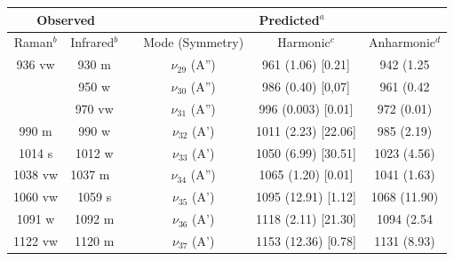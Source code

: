 	\begin{table}[H]
		\begin{center}
			\begin{threeparttable}
				\begin{tabular}{c c c c c c}
					\hline
					\multicolumn{ 2}{c}{Observed} & \multicolumn{1}{c}{} & \multicolumn{ 3}{c}{Predicted$^{a}$} \\ \hline
					Raman$^{b}$ & \multicolumn{1}{c}{Infrared$^{b}$} &  & \multicolumn{1}{c}{Mode (Symmetry)} & \multicolumn{1}{c}{Harmonic$^{c}$} & Anharmonic$^{d}$ \\ \hline
					936 vw & 930 m &  & $\nu_{29}$ (A”) & 961 (1.06) [0.21] & 942 (1.25 \\ 
					& 950 w &  & $\nu_{30}$ (A”) & 986 (0.40) [0,07] & 961 (0.42 \\ 
					& 970 vw &  & $\nu_{31}$ (A”) & 996 (0.003) [0.01] & 972 (0.01) \\ 
					990 m & 990 w &  & $\nu_{32}$ (A’) & 1011 (2.23) [22.06] & 985 (2.19) \\ 
1014 s& 1012 w&  & $\nu_{33}$ (A’)& 1050 (6.99) [30.51] & 1023 (4.56)\\ 
1038 vw& \multicolumn{1}{l}{  1037 m } &  & \multicolumn{1}{c}{$\nu_{34}$ (A”)} & 1065 (1.20) [0.01] & 1041 (1.63) \\ 
1060 vw& 1059 s&  & \multicolumn{1}{c}{	$\nu_{35}$ (A’)} & 1095 (12.91) [1.12] & 1068 (11.90)\\ 
1091 w& 1092 m&  & \multicolumn{1}{c}{	$\nu_{36}$ (A’)} & 1118 (2.11) [21.30] & 1094 (2.54 \\ 
1122 vw& 1120 m&  & \multicolumn{1}{c}{	$\nu_{37}$ (A’)} & 1153 (12.36) [0.78] & 1131 (8.93) \\


\end{tabular}
\end{threeparttable}
\end{center}
\end{table}
